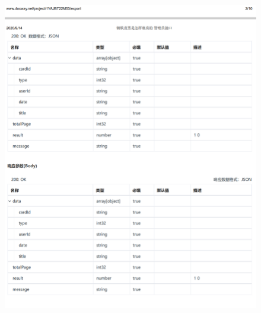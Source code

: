     \begin{figure}[h]
        \centering
        \includegraphics[height=19.0cm,width=14.0cm]{design/image/api35.png} 
        \end{figure}  
        \newpage
